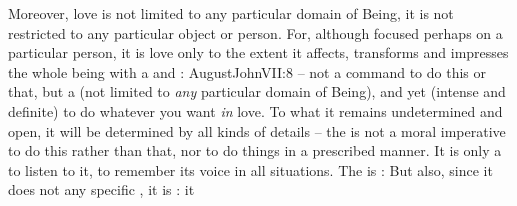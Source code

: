 Moreover, love is not limited to any particular domain of Being, it is not
restricted to any particular object or person.  For, although focused perhaps
on a particular person, it is love only to the extent it affects, transforms and
impresses the whole being with a  and : \citet{love, and do
what you wilt}{AugustJohn}{VII:8} -- not a command to do this or that, but a
 (not 
limited to {\em any} particular domain of Being), and yet  (intense and
definite)  to do whatever you want {\em in} 
love.  To what  it 
remains undetermined and open, it will be determined by all kinds of details --
the  is not a moral imperative to do this rather than that, nor 
to do things in a prescribed manner. It is only a  to listen to it,
to remember its  voice in all  situations. The
 is :  But also, since it
does not  any specific , it is : it 




